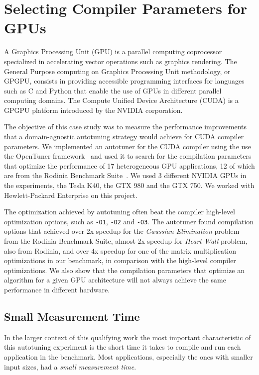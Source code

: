 \section{Selecting Compiler Parameters for GPUs}
\label{sec:paramSelGPU}

A Graphics Processing Unit (GPU) is a parallel computing coprocessor
specialized in accelerating vector operations such as graphics rendering. The
General Purpose computing on Graphics Processing Unit methodology, or GPGPU,
consists in providing accessible programming interfaces for languages such as C
and Python that enable the use of GPUs in different parallel computing domains.
The Compute Unified Device Architecture (CUDA) is a GPGPU platform introduced
by the NVIDIA corporation.

The objective of this case study was to measure the performance improvements
that a domain-agnostic autotuning strategy would achieve for CUDA compiler
parameters. We implemented an autotuner for the CUDA compiler using the use the
OpenTuner framework~\cite{ansel2014opentuner} and used it to search for the
compilation parameters that optimize the performance of 17 heterogeneous GPU
applications, 12 of which are from the Rodinia Benchmark
Suite~\cite{che2009rodinia}.  We used 3 different NVIDIA GPUs in the
experiments, the Tesla K40, the GTX 980 and the GTX 750. We worked with
Hewlett-Packard Enterprise on this project.

The optimization achieved by autotuning often beat the compiler high-level
optimization options, such as \texttt{-O1}, \texttt{-O2} and \texttt{-O3}.  The
autotuner found compilation options that achieved over 2x speedup for the
\textit{Gaussian Elimination} problem from the Rodinia Benchmark Suite, almost
2x speedup for \emph{Heart Wall} problem, also from Rodinia, and over 4x
speedup for one of the matrix multiplication optimizations in our benchmark, in
comparison with the high-level compiler optimizations.  We also show that the
compilation parameters that optimize an algorithm for a given GPU architecture
will not always achieve the same performance in different hardware.

\subsection{Small Measurement Time}
\label{subsec:smalltime}

In the larger context of this qualifying work the most important characteristic
of this autotuning experiment is the short time it takes to compile and run
each application in the benchmark. Most applications, especially the ones with
smaller input sizes, had a \textit{small measurement time}.

